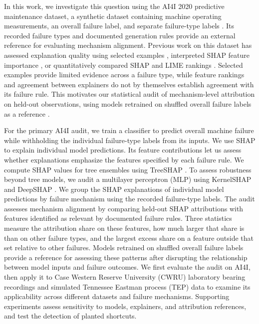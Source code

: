 \documentclass[conference]{IEEEtran}
\begin{document}
In this work, we investigate this question using the AI4I 2020 predictive maintenance dataset, a synthetic dataset containing machine operating measurements, an overall failure label, and separate failure-type labels \cite{uci2020ai4i}. Its recorded failure types and documented generation rules provide an external reference for evaluating mechanism alignment. Previous work on this dataset has assessed explanation quality using selected examples \cite{matzka2020explainable}, interpreted SHAP feature importance \cite{milling2025shap}, or quantitatively compared SHAP and LIME rankings \cite{obeten2026agreement}. Selected examples provide limited evidence across a failure type, while feature rankings and agreement between explainers do not by themselves establish agreement with its failure rule. This motivates our statistical audit of mechanism-level attribution on held-out observations, using models retrained on shuffled overall failure labels as a reference \cite{altmann2010permutation}.

For the primary AI4I audit, we train a classifier to predict overall machine failure while withholding the individual failure-type labels from its inputs. We use SHAP to explain individual model predictions. Its feature contributions let us assess whether explanations emphasize the features specified by each failure rule. We compute SHAP values for tree ensembles using TreeSHAP \cite{lundberg2020treeshap}. To assess robustness beyond tree models, we audit a multilayer perceptron (MLP) using KernelSHAP and DeepSHAP \cite{lundberg2017shap}. We group the SHAP explanations of individual model predictions by failure mechanism using the recorded failure-type labels. The audit assesses mechanism alignment by comparing held-out SHAP attributions with features identified as relevant by documented failure rules. Three statistics measure the attribution share on these features, how much larger that share is than on other failure types, and the largest excess share on a feature outside that set relative to other failures. Models retrained on shuffled overall failure labels provide a reference for assessing these patterns after disrupting the relationship between model inputs and failure outcomes. We first evaluate the audit on AI4I, then apply it to Case Western Reserve University (CWRU) laboratory bearing recordings \cite{cwru_data} and simulated Tennessee Eastman process (TEP) data \cite{reinartz2021tep} to examine its applicability across different datasets and failure mechanisms. Supporting experiments assess sensitivity to models, explainers, and attribution references, and test the detection of planted shortcuts.
\end{document}

